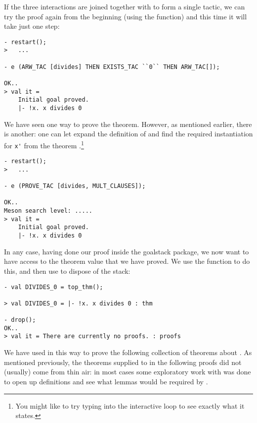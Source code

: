 If the three interactions are joined together with  to
form a single tactic, we can try the proof again from the
beginning (using the  function) and this time it will
take just one step:
\begin{session}\begin{verbatim}
- restart();
>   ...

- e (ARW_TAC [divides] THEN EXISTS_TAC ``0`` THEN ARW_TAC[]);

OK..
> val it =
    Initial goal proved.
    |- !x. x divides 0
\end{verbatim}\end{session}
We have seen one way to prove the theorem. However, as mentioned
earlier, there is another: one can let  expand the
definition of  and find the required instantiation for
\verb+x'+ from the theorem .\footnote{You might
  like to try typing  into the interactive loop
  to see exactly what it states.}
\begin{session}\begin{verbatim}
- restart();
>   ...

- e (PROVE_TAC [divides, MULT_CLAUSES]);

OK..
Meson search level: .....
> val it =
    Initial goal proved.
    |- !x. x divides 0
\end{verbatim}\end{session}
    In any case, having done our proof inside the goalstack package,
    we now want to have access to the theorem value that we have
    proved.  We use the  function to do this, and then
    use  to dispose of the stack:
\begin{session}\begin{verbatim}
- val DIVIDES_0 = top_thm();

> val DIVIDES_0 = |- !x. x divides 0 : thm

- drop();
OK..
> val it = There are currently no proofs. : proofs
\end{verbatim}\end{session}

We have used  in this way to prove the following
collection of theorems about . As mentioned previously, the
theorems supplied to  in the following proofs did not
(usually) come from thin air: in most cases some exploratory work with
 was done to open up definitions and see what lemmas would
be required by .

